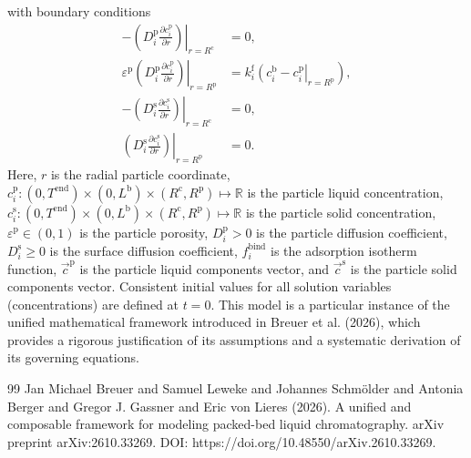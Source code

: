 \documentclass{article}
\begin{document}
with boundary conditions
\begin{align}
    - \left. \left( D^{\mathrm{p}}_{i} \frac{\partial c^{\mathrm{p}}_{i}}{\partial r} \right) \right|_{r=R^{\mathrm{c}}}
    &= 0,
    \\
    \varepsilon^{\mathrm{p}} \left. \left( D^{\mathrm{p}}_{i} \frac{\partial c^{\mathrm{p}}_{i}}{\partial r} \right)\right|_{r = R^{\mathrm{p}}}
    &= k^{\mathrm{f}}_{i} \left. \left( c^{\mathrm{b}}_{i} - c^{\mathrm{p}}_{i} \right|_{r = R^{\mathrm{p}}} \right),
    \\
    - \left( \left. D^{\mathrm{s}}_{i} \frac{\partial c^{\mathrm{s}}_{i}}{\partial r} \right) \right|_{r=R^{\mathrm{c}}}
    &= 0,
    \\
    \left( \left. D^{\mathrm{s}}_{i} \frac{\partial c^{\mathrm{s}}_{i}}{\partial r} \right) \right|_{r = R^{\mathrm{p}}}
    &= 0.
\end{align}
Here, $r$ is the radial particle coordinate, $c^{\mathrm{p}}_{i}\colon (0, T^{\mathrm{end}}) \times (0, L^{\mathrm{b}})\times (R^{\mathrm{c}}, R^{\mathrm{p}}) \mapsto \mathbb{R}$ is the particle liquid concentration, $c^{\mathrm{s}}_{i}\colon (0, T^{\mathrm{end}}) \times (0, L^{\mathrm{b}})\times (R^{\mathrm{c}}, R^{\mathrm{p}}) \mapsto \mathbb{R}$ is the particle solid concentration, $\varepsilon^{\mathrm{p}}\in (0, 1)$ is the particle porosity, $D^{\mathrm{p}}_{i}> 0$ is the particle diffusion coefficient, $D^{\mathrm{s}}_{i}\geq 0$ is the surface diffusion coefficient, $f^{\mathrm{bind}}_{i}$ is the adsorption isotherm function, $\vec{c}^{\mathrm{p}}$ is the particle liquid components vector, and $\vec{c}^{\mathrm{s}}$ is the particle solid components vector.
Consistent initial values for all solution variables (concentrations) are defined at $t = 0$.
This model is a particular instance of the unified mathematical framework introduced in Breuer et al. (2026), which provides a rigorous justification of its assumptions and a systematic derivation of its governing equations.
\begin{thebibliography}{99}
     Jan Michael Breuer and Samuel Leweke and Johannes Schmölder and Antonia Berger and Gregor J. Gassner and Eric von Lieres (2026). A unified and composable framework for modeling packed-bed liquid chromatography. arXiv preprint arXiv:2610.33269. DOI: https://doi.org/10.48550/arXiv.2610.33269.
\end{thebibliography}
\end{document}
